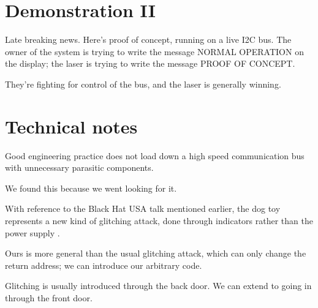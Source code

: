 \documentclass[letterpaper]{article}
\begin{document}
\section{Demonstration II}
Late breaking news. Here's proof of concept, running on a live I2C bus. The
owner of the system is trying to write the message NORMAL OPERATION on the
display; the laser is trying to write the message PROOF OF CONCEPT.

They're fighting for control of the bus, and the laser is generally winning.
\section{Technical notes}
Good engineering practice does not load down a high speed communication bus
with unnecessary parasitic components.

We found this because we went looking for it.

With reference to the Black Hat USA talk mentioned earlier, the dog toy
represents a new kind of glitching attack, done through indicators rather than
the power supply \cite{Beaumont2024a}.

Ours is more general than the usual glitching attack, which can only change the
return address; we can introduce our arbitrary code.

Glitching is usually introduced through the back door. We can extend to going
in through the front door.
\end{document}
